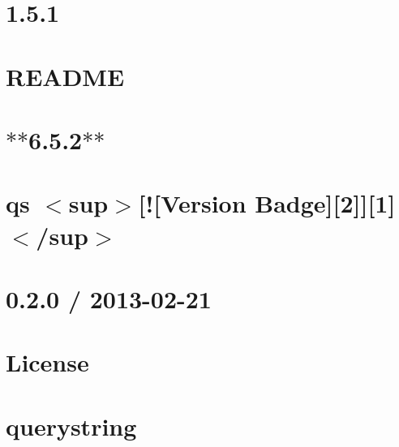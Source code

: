 \documentclass[twoside]{book}
\newcommand{\+}{\discretionary{\mbox{\scriptsize$\hookleftarrow$}}{}{}}
\begin{document}
\chapter{1.5.1}
\label{md_dsmacc_examples_DRmerge_node_modules_q_CHANGES}

\chapter{R\+E\+A\+D\+ME}
\label{md_dsmacc_examples_DRmerge_node_modules_q_README}

\chapter{$\ast$$\ast$6.5.2$\ast$$\ast$}
\label{md_dsmacc_examples_DRmerge_node_modules_qs_CHANGELOG}

\chapter{qs $<$sup$>$\mbox{[}!\mbox{[}Version Badge\mbox{]}\mbox{[}2\mbox{]}\mbox{]}\mbox{[}1\mbox{]}$<$/sup$>$}
\label{md_dsmacc_examples_DRmerge_node_modules_qs_README}

\chapter{0.2.0 / 2013-\/02-\/21}
\label{md_dsmacc_examples_DRmerge_node_modules_querystring_History}

\chapter{License}
\label{md_dsmacc_examples_DRmerge_node_modules_querystring_License}

\chapter{querystring}
\label{md_dsmacc_examples_DRmerge_node_modules_querystring_Readme}

\end{document}
